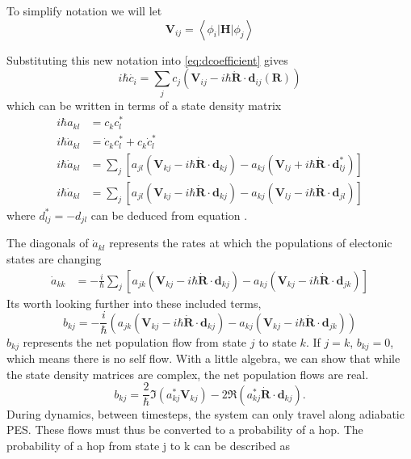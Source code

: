 To simplify notation we will let
\begin{equation}
  \mathbf{V}_{ij} = \left< \phi_i | \mathbf{H} | \phi_j \right>
\end{equation}

Substituting this new notation into \ref{eq:dcoefficient} gives
\begin{equation}
  i\hbar \dot{c_i} = \sum_j c_j \left(\mathbf{V}_{ij} - i\hbar \dot{\mathbf{R}}\cdot\mathbf{d}_{ij}(\mathbf{R}) \right)
\end{equation}
which can be written in terms of a state density matrix
\begin{align}
  i\hbar a_{kl} &= c_k c_l^*\\
  i\hbar \dot{a}_{kl} &= \dot{c}_k c_l^* + c_k \dot{c}_l^* \\
  i\hbar \dot{a}_{kl} &= \sum_j \left[ a_{jl} (\mathbf{V}_{kj} - i\hbar \dot{\mathbf{R}} \cdot \mathbf{d}_{kj})
			- a_{kj} ( \mathbf{V}_{lj} + i\hbar \dot{\mathbf{R}} \cdot \mathbf{d}_{lj}^*) \right] \\
  i\hbar \dot{a}_{kl} &= \sum_j \left[ a_{jl} (\mathbf{V}_{kj} - i\hbar \dot{\mathbf{R}} \cdot \mathbf{d}_{kj})
			- a_{kj} ( \mathbf{V}_{lj} - i\hbar \dot{\mathbf{R}} \cdot \mathbf{d}_{jl}) \right]
\end{align}
where \(d_{lj}^* = -d_{jl}\) can be deduced from equation \label{eq:tullynacoupling}.

The diagonals of \(\dot{a}_{kl}\) represents the rates at which the populations of electonic states are changing
\begin{align}
  \dot{a}_{kk} &= -\frac{i}{\hbar}\sum_j \left[ a_{jk} (\mathbf{V}_{kj} - i\hbar \dot{\mathbf{R}} \cdot \mathbf{d}_{kj})
		 - a_{kj} ( \mathbf{V}_{kj} - i\hbar \dot{\mathbf{R}} \cdot \mathbf{d}_{jk}) \right]
\end{align}
Its worth looking further into these included terms,
\begin{equation}
  b_{kj} = - \frac{i}{\hbar} \left(a_{jk} (\mathbf{V}_{kj} - i\hbar \dot{\mathbf{R}} \cdot \mathbf{d}_{kj}) - a_{kj} ( \mathbf{V}_{kj} - i\hbar \dot{\mathbf{R}} \cdot \mathbf{d}_{jk})\right)
\end{equation}
\(b_{kj}\) represents the net population flow from state \(j\) to state \(k\). If \(j = k \), \(b_{kj} = 0\), which means there is no self flow.
With a little algebra, we can show that while the state density matrices are complex, the net population flows are real.
\begin{equation} \label{eq:tullyb2a} 
  b_{kj} =
  \frac{2}{\hbar}\Im\left(a_{kj}^*\mathbf{V}_{kj}\right) - 2\Re\left(a_{kj}^*
    \dot{\mathbf{R}} \cdot \mathbf{d}_{kj}\right).
\end{equation}
During dynamics, between timesteps, the system can only travel along adiabatic PES. 
These flows must thus be converted to a probability of a hop.
The probability of a hop from state j to k can be described as

